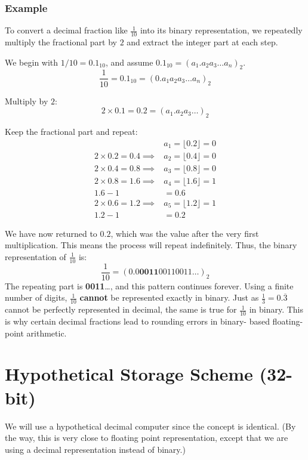 \subsubsection{Example}

To convert a decimal fraction like $\frac{1}{10}$ into its binary 
representation, we repeatedly multiply the fractional part by $2$ and extract
the integer part at each step.

We begin with $1/10 = 0.1_{10}$, and assume $0.1_{10} = (a_1.a_2a_3\dots
a_n)_2$.
\[
\frac{1}{10} = 0.1_{10} = (0.a_1a_2a_3\dots a_n)_{2}
\]

Multiply by $2$:
\[
2 \times 0.1 = 0.2 = (a_1.a_2a_3\dots)_2
\]

Keep the fractional part and repeat:
\begin{align*}
  &a_1 = \lfloor 0.2 \rfloor = 0 \\
  2 \times 0.2 = 0.4 \implies &a_2 = \lfloor 0.4 \rfloor = 0 \\
  2 \times 0.4 = 0.8 \implies &a_3 = \lfloor 0.8 \rfloor = 0 \\
  2 \times 0.8 = 1.6 \implies &a_4 = \lfloor 1.6 \rfloor = 1 \\
  1.6 - 1 &= 0.6 \\
  2 \times 0.6 = 1.2 \implies &a_5 = \lfloor 1.2 \rfloor = 1 \\
  1.2 - 1 &= 0.2
\end{align*}

We have now returned to $0.2$, which was the value after the very first 
multiplication. This means the process will repeat indefinitely. Thus, the 
binary representation of $\frac{1}{10}$ is:
\[
  \frac{1}{10} = (0.0\mathbf{0011}00110011\dots)_2
\]
The repeating part is \textbf{0011}\dots, and this pattern continues forever. 
Using a finite number of digits, $\frac{1}{10}$ \textbf{cannot} be represented
exactly in binary. Just as $\frac{1}{3} = 0.\overline{3}$ cannot
be perfectly represented in decimal, the same is true for $\frac{1}{10}$ in
binary. This is why certain decimal fractions lead to rounding errors in binary-
based floating-point arithmetic.

\section{Hypothetical Storage Scheme (32-bit)}

We will use a hypothetical decimal computer since the concept is identical.
(By the way, this is very close to 
 floating point
representation, except that we are using a decimal representation instead of
binary.)

